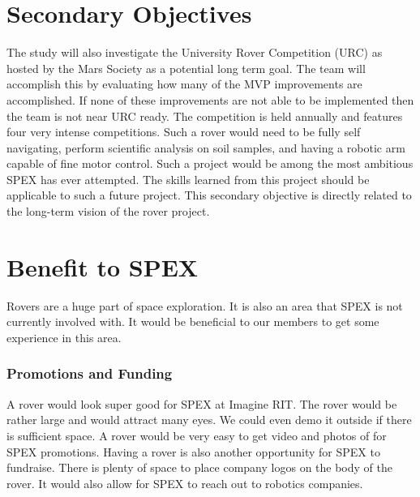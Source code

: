 \documentclass[conference]{IEEEtran} %
\begin{document}

\section{Secondary Objectives}
\label{sec:secondary-obj}
The study will also investigate the University Rover Competition (URC) as hosted by the Mars Society as a potential long term goal. 
The team will accomplish this by evaluating how many of the MVP improvements are accomplished. 
If none of these improvements are not able to be implemented then the team is not near URC ready.
The competition is held annually and features four very intense competitions. 
Such a rover would need to be fully self navigating, perform scientific analysis on soil samples, and having a robotic arm capable of fine motor control. 
Such a project would be among the most ambitious SPEX has ever attempted. The skills learned from this project should be applicable to such a future project. 
This secondary objective is directly related to the long-term vision of the rover project. 

\section{Benefit to SPEX}
\label{sec:benefit}

Rovers are a huge part of space exploration. 
It is also an area that SPEX is not currently involved with. 
It would be beneficial to our members to get some experience in this area.
\subsubsection{Promotions and Funding}
A rover would look super good for SPEX at Imagine RIT. 
The rover would be rather large and would attract many eyes. We could even demo it outside if there is sufficient space. 
A rover would be very easy to get video and photos of for SPEX promotions. 
Having a rover is also another opportunity for SPEX to fundraise. 
There is plenty of space to place company logos on the body of the rover. 
It would also allow for SPEX to reach out to robotics companies.
\end{document}
